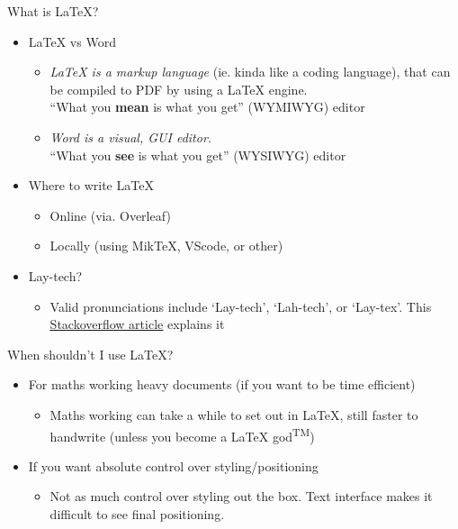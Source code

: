 \documentclass{beamer}
\begin{document}
\begin{frame}[fragile]{What is \LaTeX{}?}
    \begin{itemize}
        \item \LaTeX{} vs Word
        \begin{itemize}
            \item \emph{LaTeX is a markup language} (ie. kinda like a coding language), that can be compiled to PDF by using a LaTeX engine.\\
            ``What you \textbf{mean} is what you get'' (WYMIWYG) editor
            \item \emph{Word is a visual, GUI editor.}\\
            ``What you \textbf{see} is what you get'' (WYSIWYG) editor
        \end{itemize}
        
        \item Where to write LaTeX
        \begin{itemize}
            \item Online (via. Overleaf)
            \item Locally (using MikTeX, VScode, or other)
        \end{itemize}

        \item Lay-tech?
        \begin{itemize}
            \item Valid pronunciations include `Lay-tech', `Lah-tech', or `Lay-tex'. This \href{https://tex.stackexchange.com/q/17502}{\color{blue}\underline{Stackoverflow article}} explains it
        \end{itemize}
    \end{itemize}
    
\end{frame}

\begin{frame}[fragile]{When shouldn't I use \LaTeX{}?}
    \begin{itemize}
        \item For maths working heavy documents (if you want to be time efficient)
        \begin{itemize}
            \item Maths working can take a while to set out in LaTeX, still faster to handwrite (unless you become a LaTeX god\textsuperscript{TM})
        \end{itemize}

        \item If you want absolute control over styling/positioning
        \begin{itemize}
            \item Not as much control over styling out the box. Text interface makes it difficult to see final positioning.
        \end{itemize}
    \end{itemize}
\end{frame}
\end{document}
